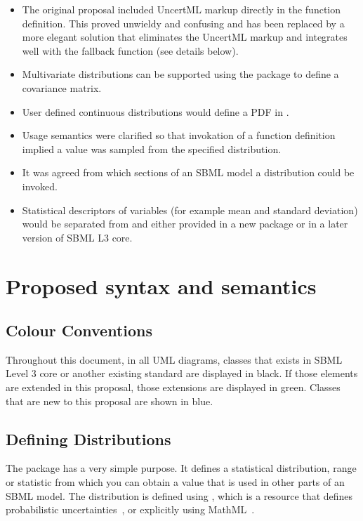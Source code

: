 \documentclass[draftspec]{sbmlpkgspec}
\begin{document}
\begin{itemize}
\item The original proposal included UncertML markup directly in the
  function definition. This proved unwieldy and confusing and has been
  replaced by a more elegant solution that eliminates the UncertML
  markup and integrates well with the fallback function (see details
  below).
\item Multivariate distributions can be supported using the \arrays
  package to define a covariance matrix.
\item User defined continuous distributions would define a PDF in
  \mathml.
\item Usage semantics were clarified so that invokation of a function
  definition implied a value was sampled from the specified
  distribution.
\item It was agreed from which sections of an SBML model a
  distribution could be invoked.
\item Statistical descriptors of variables (for
  example mean and standard deviation) would be separated from
  \distrib and either provided in a new package or in a later version
  of SBML L3 core.
\end{itemize}

\section{Proposed syntax and semantics}

\subsection{Colour Conventions}

Throughout this document, in all UML diagrams, classes that exists in
SBML Level 3 core or another existing standard are displayed in
black. If those elements are extended in this proposal, those
extensions are displayed in green. Classes that are new to this
proposal are shown in blue.

\subsection{Defining Distributions}

The \distrib package has a very simple purpose. It defines a
statistical distribution, range or statistic from which you can obtain
a value that is used in other parts of an SBML model. The distribution
is defined using \uncertml, which is a resource that defines
probabilistic uncertainties~\cite{uncertml}, or explicitly using
MathML~\cite{mathml2}.
\end{document}
